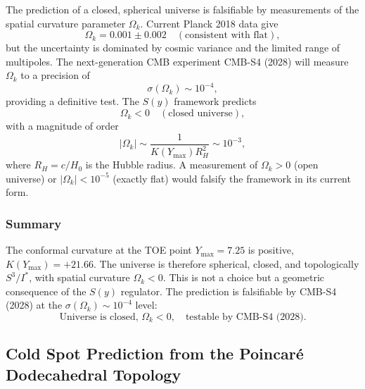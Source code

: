 \documentclass[a4paper,1pt,oneside,openany]{book}
\begin{document}
The prediction of a closed, spherical universe is falsifiable by measurements of the spatial curvature parameter $\Omega_k$. Current Planck 2018 data give
\begin{equation}
\Omega_k = 0.001 \pm 0.002 \quad (\text{consistent with flat}),
\label{eq:Omega-k-Planck}
\end{equation}
but the uncertainty is dominated by cosmic variance and the limited range of multipoles. The next-generation CMB experiment CMB-S4 (2028) will measure $\Omega_k$ to a precision of
\begin{equation}
\sigma(\Omega_k) \sim 10^{-4},
\label{eq:sigma-Omegak}
\end{equation}
providing a definitive test. The $S(y)$ framework predicts
\begin{equation}
\boxed{\Omega_k < 0 \quad (\text{closed universe}),}
\label{eq:prediction-closed}
\end{equation}
with a magnitude of order
\begin{equation}
|\Omega_k| \sim \frac{1}{K(Y_{\max}) R_H^2} \sim 10^{-3},
\label{eq:Omega-k-magnitude}
\end{equation}
where $R_H = c/H_0$ is the Hubble radius. A measurement of $\Omega_k > 0$ (open universe) or $|\Omega_k| < 10^{-5}$ (exactly flat) would falsify the framework in its current form.

\subsubsection{Summary}

The conformal curvature at the TOE point $Y_{\max} = 7.25$ is positive, $K(Y_{\max}) = +21.66$. The universe is therefore spherical, closed, and topologically $S^3/I^*$, with spatial curvature $\Omega_k < 0$. This is not a choice but a geometric consequence of the $S(y)$ regulator. The prediction is falsifiable by CMB-S4 (2028) at the $\sigma(\Omega_k) \sim 10^{-4}$ level:
\begin{equation}
\boxed{\text{Universe is closed, } \Omega_k < 0, \quad \text{testable by CMB-S4 (2028).}}
\label{eq:closed-universe-summary}
\end{equation}
\subsection{Cold Spot Prediction from the Poincar\'e Dodecahedral Topology}
\label{sec:cold-spot-prediction}
\end{document}

